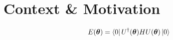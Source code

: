\section{Context \& Motivation}%
\label{context-motivation}

\begin{equation*}
    E(\bm\theta) = \bra{0} U^\dagger(\bm\theta) H U(\bm\theta) \ket{0} 
\end{equation*}
